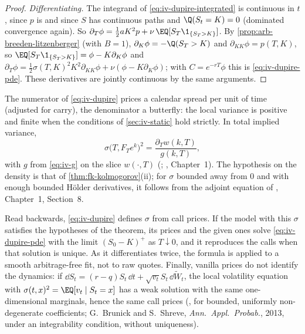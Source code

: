 \begin{proof}
\emph{Differentiating.} The integrand of \eqref{eq:iv-dupire-integrated} is continuous in $t$, since $p$ is
and since $S$ has continuous paths and $\Q(S_t=K)=0$ (dominated convergence again). So
$\partial_T\phi=\frac12aK^2p+\nu\,\EQ[S_T\1_{\{S_T>K\}}]$. By \cref{prop:arb-breeden-litzenberger} (with $B=1$),
$\partial_K\phi=-\Q(S_T>K)$ and $\partial_{KK}\phi=p(T,K)$, so $\EQ[S_T\1_{\{S_T>K\}}]=\phi-K\partial_K\phi$ and
$\partial_T\phi=\frac12\sigma(T,K)^2K^2\partial_{KK}\phi+\nu(\phi-K\partial_K\phi)$; with $C=e^{-rT}\phi$ this is
\eqref{eq:iv-dupire-pde}. These derivatives are jointly continuous by the same arguments.
\end{proof}

The numerator of \eqref{eq:iv-dupire} prices a calendar spread per unit of time (adjusted for carry), the
denominator a butterfly: the local variance is positive and finite when the conditions of
\cref{sec:iv-static} hold strictly. In total implied variance,
\begin{equation}\label{eq:iv-dupire-w}
  \sigma\big(T,F_Te^k\big)^2=\frac{\partial_Tw(k,T)}{g(k,T)},
\end{equation}
with $g$ from \eqref{eq:iv-g} on the slice $w(\cdot,T)$ (;
\textcite{gatheral-volatility-surface}, Chapter~1). The hypothesis on the density is that of
\cref{thm:fk-kolmogorov}(ii); for $\sigma$ bounded away from $0$ and with enough bounded H\"older derivatives,
it follows from the adjoint equation of \textcite{friedman-parabolic}, Chapter~1, Section~8.

\begin{remark}\label{rem:iv-dupire-use}
Read backwards, \eqref{eq:iv-dupire} defines $\sigma$ from call prices. If the model with this $\sigma$
satisfies the hypotheses of the theorem, its prices and the given ones solve \eqref{eq:iv-dupire-pde} with
the limit $(S_0-K)^+$ as $T\downarrow0$, and it reproduces the calls when that solution is unique. As it
differentiates twice, the formula is applied to a smooth arbitrage-free fit, not to raw quotes. Finally,
vanilla prices do not identify the dynamics: if $\dd S_t=(r-q)S_t\,\dd t+\sqrt{v_t}S_t\,\dd\widetilde W_t$,
the local volatility equation with $\sigma(t,x)^2=\EQ[v_t\mid S_t=x]$ has a weak solution with the same
one-dimensional marginals, hence the same call prices (\textcite{gyongy-mimicking}, for bounded,
uniformly non-degenerate coefficients; G.~Brunick and S.~Shreve, \emph{Ann.\ Appl.\ Probab.}, 2013,
under an integrability condition, without uniqueness).
\end{remark}

